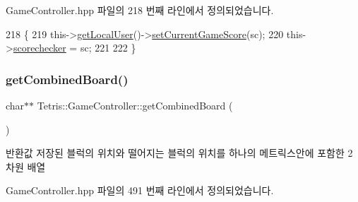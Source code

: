 Game\+Controller.\+hpp 파일의 218 번째 라인에서 정의되었습니다.


\begin{DoxyCode}
218                                                      \{
219             this->\hyperlink{class_tetris_1_1_game_controller_abc67d4b309ce2886b43a3b4e0af22abc}{getLocalUser}()->\hyperlink{class_tetris_1_1_users_1_1_game_user_aa37f3ed5891a4efecc09f92188b8a9cd}{setCurrentGameScore}(sc);
220             this->\hyperlink{class_tetris_1_1_game_controller_a2982c5246ef73b6c9affa6d25d575982}{scorechecker} = sc;
221             
222         \}
\end{DoxyCode}
\mbox{\label{class_tetris_1_1_game_controller_a6c22f25017881f6150428b62e4607310}} 
\subsubsection{\texorpdfstring{get\+Combined\+Board()}{getCombinedBoard()}}
{\footnotesize\ttfamily char$\ast$$\ast$ Tetris\+::\+Game\+Controller\+::get\+Combined\+Board (\begin{DoxyParamCaption}{ }\end{DoxyParamCaption})\hspace{0.3cm}{\ttfamily [inline]}}

\begin{DoxyReturn}{반환값}
저장된 블럭의 위치와 떨어지는 블럭의 위치를 하나의 메트릭스안에 포함한 2차원 배열 
\end{DoxyReturn}


Game\+Controller.\+hpp 파일의 491 번째 라인에서 정의되었습니다.


